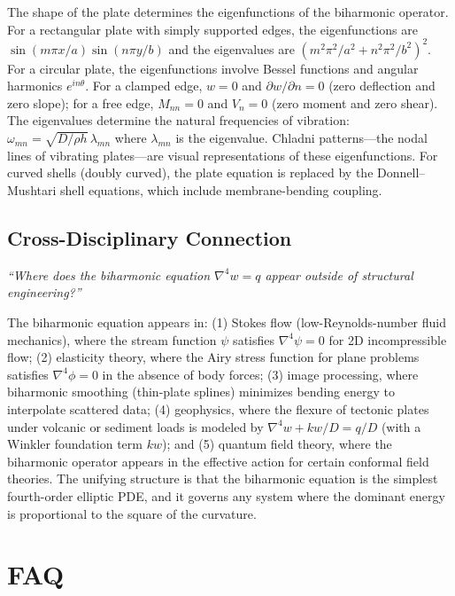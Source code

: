The shape of the plate determines the eigenfunctions of the biharmonic operator. For a rectangular plate with simply supported edges, the eigenfunctions are $\sin(m\pi x/a)\sin(n\pi y/b)$ and the eigenvalues are $(m^{2}\pi^{2}/a^{2} + n^{2}\pi^{2}/b^{2})^{2}$. For a circular plate, the eigenfunctions involve Bessel functions and angular harmonics $e^{in\theta}$. For a clamped edge, $w = 0$ and $\partial w/\partial n = 0$ (zero deflection and zero slope); for a free edge, $M_{nn} = 0$ and $V_{n} = 0$ (zero moment and zero shear). The eigenvalues determine the natural frequencies of vibration: $\omega_{mn} = \sqrt{D/\rho h}\,\lambda_{mn}$ where $\lambda_{mn}$ is the eigenvalue. Chladni patterns---the nodal lines of vibrating plates---are visual representations of these eigenfunctions. For curved shells (doubly curved), the plate equation is replaced by the Donnell--Mushtari shell equations, which include membrane-bending coupling.

\subsection*{Cross-Disciplinary Connection}
\textit{``Where does the biharmonic equation $\nabla^{4}w = q$ appear outside of structural engineering?''}

The biharmonic equation appears in: (1) Stokes flow (low-Reynolds-number fluid mechanics), where the stream function $\psi$ satisfies $\nabla^{4}\psi = 0$ for 2D incompressible flow; (2) elasticity theory, where the Airy stress function for plane problems satisfies $\nabla^{4}\phi = 0$ in the absence of body forces; (3) image processing, where biharmonic smoothing (thin-plate splines) minimizes bending energy to interpolate scattered data; (4) geophysics, where the flexure of tectonic plates under volcanic or sediment loads is modeled by $\nabla^{4}w + kw/D = q/D$ (with a Winkler foundation term $kw$); and (5) quantum field theory, where the biharmonic operator appears in the effective action for certain conformal field theories. The unifying structure is that the biharmonic equation is the simplest fourth-order elliptic PDE, and it governs any system where the dominant energy is proportional to the square of the curvature.

\section*{FAQ}

